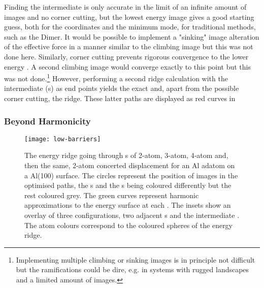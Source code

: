 Finding the intermediate  is only accurate in the limit of an infinite amount of images and no corner cutting, but the lowest energy image gives a good starting guess, both for the coordinates and the minimum mode, for traditional  methods, such as the Dimer.
It would be possible to implement a "sinking" image alteration of the effective force in a manner similar to the climbing image but this was not done here.
Similarly, corner cutting prevents rigorous convergence to the lower energy .
A second climbing image would converge exactly to this point but this was not done.\footnote{Implementing multiple climbing or sinking images is in principle not difficult but the ramifications could be dire, e.g. in systems with rugged landscapes and a limited amount of images.}
However, performing a second ridge calculation with the intermediate (s) as end points yields the exact  and, apart from the possible corner cutting, the ridge.
These latter paths are displayed as red curves in 

\subsubsection{Beyond Harmonicity}
\begin{figure}[hp]
\begin{center}
\texttt{[image: low-barriers]}
    \parbox{0.85\linewidth}{
\caption{
The energy ridge going through s of 2-atom, 3-atom, 4-atom and, then the same, 2-atom concerted displacement for an Al adatom on a Al(100) surface.
The circles represent the position of images in the optimised paths, the s and the s being coloured differently but the rest coloured grey.
The green curves represent harmonic approximations to the energy surface at each .
The insets show an overlay of three configurations, two adjacent s and the intermediate .
The atom colours correspond to the coloured spheres of the energy ridge.
}
\label{fig:low-barriers}
}
\end{center}
\end{figure}

